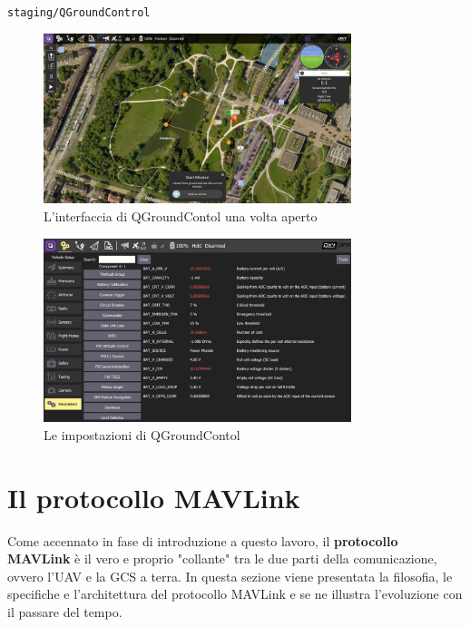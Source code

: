 \documentclass[a4paper, 12pt, oneside]{article}
\begin{document}
\begin{center}
    \texttt{staging/QGroundControl}
\end{center}

\begin{figure}[H]
    \centering
    \includegraphics[width=0.8\textwidth]{images/QGroundCotrol-Interface.jpg}
    \caption{L'interfaccia di QGroundContol una volta aperto}
\end{figure}

\begin{figure}[H]
    \centering
    \includegraphics[width=0.8\textwidth]{images/QGroundControl-settings.jpg}
    \caption{Le impostazioni di QGroundContol}
\end{figure}

\section{Il protocollo MAVLink}

Come accennato in fase di introduzione a questo lavoro, il \textbf{protocollo MAVLink} è il vero e proprio "collante" tra le due parti della comunicazione, ovvero l'UAV e la GCS a terra. In questa sezione viene presentata la filosofia, le specifiche e l'architettura del protocollo MAVLink e se ne illustra l'evoluzione con il passare del tempo.
\end{document}
